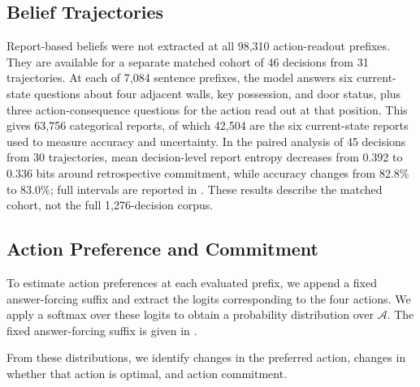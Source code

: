 \documentclass{article}
\begin{document}
\subsection{Belief Trajectories}
\label{sec:belief-trajectories}

Report-based beliefs were not extracted at all 98,310 action-readout prefixes.
They are available for a separate matched cohort of 46 decisions from 31
trajectories. At each of 7,084 sentence prefixes, the model answers six
current-state questions about four adjacent walls, key possession, and door
status, plus three action-consequence questions for the action read out at that
position. This gives 63,756 categorical reports, of which 42,504 are the six
current-state reports used to measure accuracy and uncertainty. In the paired
analysis of 45 decisions from 30 trajectories, mean decision-level report
entropy decreases from 0.392 to 0.336 bits around retrospective commitment,
while accuracy changes from 82.8\% to 83.0\%; full intervals are reported in
. These results describe the matched cohort, not the
full 1,276-decision corpus.







\subsection{Action Preference and Commitment}
\label{sec:commitment}

To estimate action preferences at each evaluated prefix, we append a fixed answer-forcing suffix and extract the logits corresponding to the four actions.
We apply a softmax over these logits to obtain a probability distribution over $\mathcal A$.
The fixed answer-forcing suffix is given in .

From these distributions, we identify changes in the preferred action, changes in whether that action is optimal, and action commitment.
\end{document}
